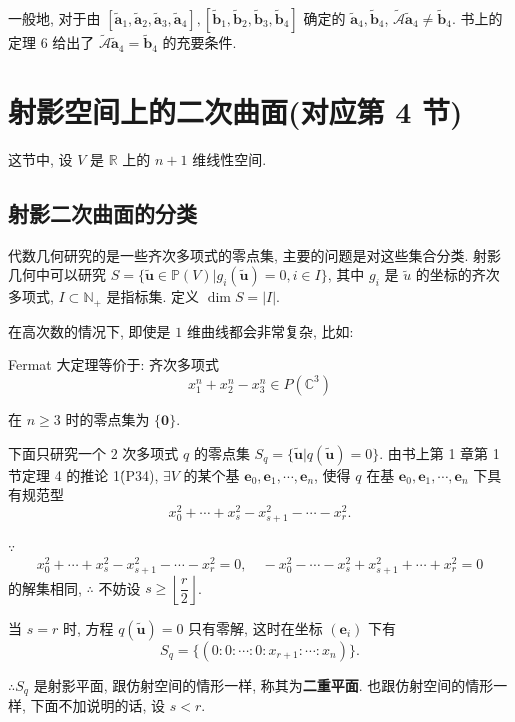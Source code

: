 \documentclass[color=black,device=normal,lang=cn,mode=geye]{elegantnote}
\begin{document}
一般地, 对于由 $[\tilde{\boldsymbol{a}}_1,\tilde{\boldsymbol{a}}_2,\tilde{\boldsymbol{a}}_3,\tilde{\boldsymbol{a}}_4],[\tilde{\boldsymbol{b}}_1,\tilde{\boldsymbol{b}}_2,\tilde{\boldsymbol{b}}_3,\tilde{\boldsymbol{b}}_4]$ 确定的 $\tilde{\boldsymbol{a}}_4,\tilde{\boldsymbol{b}}_4$, $\widetilde{\mathcal{A}}\tilde{\boldsymbol{a}}_4\neq\tilde{\boldsymbol{b}}_4$. 书上的定理 6 给出了 $\widetilde{\mathcal{A}}\tilde{\boldsymbol{a}}_4=\tilde{\boldsymbol{b}}_4$ 的充要条件.
\section{射影空间上的二次曲面(对应第 4 节)}
这节中, 设 $V$ 是 $\mathbb{R}$ 上的 $n+1$ 维线性空间.
\subsection{射影二次曲面的分类}
代数几何研究的是一些齐次多项式的零点集, 主要的问题是对这些集合分类. 射影几何中可以研究 $S=\{\tilde{\boldsymbol{u}}\in\mathbb{P}(V)|g_i(\tilde{\boldsymbol{u}})=0,i\in I\}$, 其中 $g_i$ 是 $\tilde{u}$ 的坐标的齐次多项式, $I\subset\mathbb{N}_+$ 是指标集. 定义 $\dim S=|I|$.

在高次数的情况下, 即使是 $1$ 维曲线都会非常复杂, 比如:
\begin{example}
    Fermat 大定理等价于: 齐次多项式
    \[x_1^n+x_2^n-x_3^n\in P(\mathbb{C}^3)\]

    在 $n\geq3$ 时的零点集为 $\{\boldsymbol{0}\}$.
\end{example}

下面只研究一个 $2$ 次多项式 $q$ 的零点集 $S_q=\{\tilde{\boldsymbol{u}}|q(\tilde{\boldsymbol{u}})=0\}$. 由书上第 1 章第 1 节定理 4 的推论 1\'(P34), $\exists V$ 的某个基 $\boldsymbol{e}_0,\boldsymbol{e}_1,\cdots,\boldsymbol{e}_n$, 使得 $q$ 在基 $\boldsymbol{e}_0,\boldsymbol{e}_1,\cdots,\boldsymbol{e}_n$ 下具有规范型
\[x^2_0+\cdots+x^2_s-x^2_{s+1}-\cdots-x^2_r.\]

$\because$
\[x^2_0+\cdots+x^2_s-x^2_{s+1}-\cdots-x^2_r=0,\quad -x^2_0-\cdots-x^2_s+x^2_{s+1}+\cdots+x^2_r=0\]
的解集相同, $\therefore$ 不妨设 $s\geq\left\lfloor\dfrac{r}{2}\right\rfloor$.

当 $s=r$ 时, 方程 $q(\tilde{\boldsymbol{u}})=0$ 只有零解, 这时在坐标 $(\boldsymbol{e}_i)$ 下有
\[S_q=\{(0:0:\cdots:0:x_{r+1}:\cdots:x_n)\}.\]

$\therefore S_q$ 是射影平面, 跟仿射空间的情形一样, 称其为\textbf{二重平面}. 也跟仿射空间的情形一样, 下面不加说明的话, 设 $s<r$.
\end{document}
